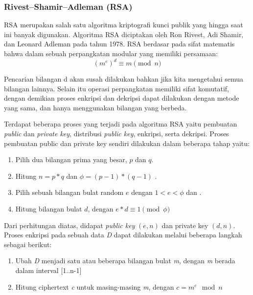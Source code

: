     \subsubsection{Rivest–Shamir–Adleman (RSA)} \label{sec:rsa_theory}
      RSA merupakan salah satu algoritma kriptografi kunci publik yang hingga saat ini banyak digunakan. Algoritma RSA diciptakan oleh Ron Rivest, Adi Shamir, dan Leonard Adleman pada tahun 1978. RSA berdasar pada sifat matematis bahwa dalam sebuah perpangkatan modular yang memiliki persamaan:
      \begin{equation}
        (m^e)^d  \equiv  m \pmod{n}
      \end{equation}

      Pencarian bilangan d akan susah dilakukan bahkan jika kita mengetahui semua bilangan lainnya. Selain itu operasi perpangkatan memiliki sifat komutatif, dengan demikian proses enkripsi dan dekripsi dapat dilakukan dengan metode yang sama, dan hanya menggunakan bilangan yang berbeda.

      Terdapat beberapa proses yang terjadi pada algoritma RSA yaitu pembuatan \textit{public} dan \textit{private key}, distribusi \textit{public key}, enkripsi, serta dekripsi. Proses pembuatan public dan private key sendiri dilakukan dalam beberapa tahap yaitu:

      \begin{enumerate}
        \item Pilih dua bilangan prima yang besar, $p$ dan $q$.
        \item Hitung $n = p*q$ dan $ \phi = (p-1)*(q-1)$ .
        \item Pilih sebuah bilangan bulat random $e$ dengan $ 1 < e < \phi$ dan .
        \item Hitung bilangan bulat $d$, dengan $ e*d  \equiv  1 \pmod{\phi} $
      \end{enumerate}

      Dari perhitungan diatas, didapat \textit{public key} $(e, n)$ dan private key $(d, n)$.
      Proses enkripsi pada sebuah data \textit{D} dapat dilakukan melalui beberapa langkah sebagai berikut:
      \begin{enumerate}
        \item Ubah \textit{D} menjadi satu atau beberapa bilangan bulat \textit{m}, dengan \textit{m} berada dalam interval [1..n-1]
        \item Hitung ciphertext \textit{c} untuk masing-masing \textit{m}, dengan $c = m^e \mod n $
      \end{enumerate}


